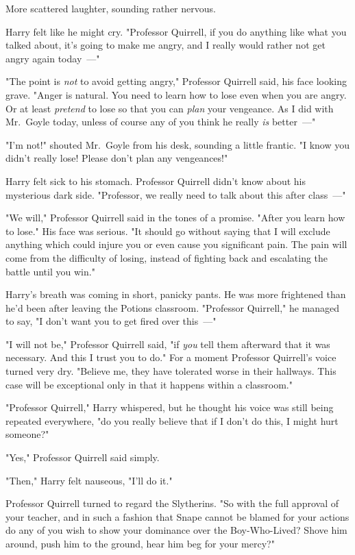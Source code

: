 More scattered laughter, sounding rather nervous.

Harry felt like he might cry. "Professor Quirrell, if you do anything like what
you talked about, it's going to make me angry, and I really would rather not
get angry again today~---"

"The point is \emph{not} to avoid getting angry," Professor Quirrell said, his
face looking grave. "Anger is natural. You need to learn how to lose even when
you are angry. Or at least \emph{pretend} to lose so that you can \emph{plan}
your vengeance. As I did with Mr.~Goyle today, unless of course any of you
think he really \emph{is} better~---"

"I'm not!" shouted Mr.~Goyle from his desk, sounding a little frantic. "I know
you didn't really lose! Please don't plan any vengeances!"

Harry felt sick to his stomach. Professor Quirrell didn't know about his
mysterious dark side. "Professor, we really need to talk about this after
class~---"

"We will," Professor Quirrell said in the tones of a promise. "After you learn
how to lose." His face was serious. "It should go without saying that I will
exclude anything which could injure you or even cause you significant pain. The
pain will come from the difficulty of losing, instead of fighting back and
escalating the battle until you win."

Harry's breath was coming in short, panicky pants. He was more frightened than
he'd been after leaving the Potions classroom. "Professor Quirrell," he managed
to say, "I don't want you to get fired over this~---"

"I will not be," Professor Quirrell said, "if \emph{you} tell them afterward
that it was necessary. And this I trust you to do." For a moment Professor
Quirrell's voice turned very dry. "Believe me, they have tolerated worse in
their hallways. This case will be exceptional only in that it happens within a
classroom."

"Professor Quirrell," Harry whispered, but he thought his voice was still being
repeated everywhere, "do you really believe that if I don't do this, I might
hurt someone?"

"Yes," Professor Quirrell said simply.

"Then," Harry felt nauseous, "I'll do it."

Professor Quirrell turned to regard the Slytherins. "So{\el} with the full
approval of your teacher, and in such a fashion that Snape cannot be blamed for
your actions{\el} do any of you wish to show your dominance over the
Boy-Who-Lived? Shove him around, push him to the ground, hear him beg for your
mercy?"

